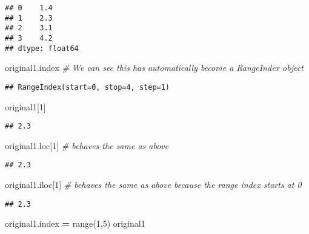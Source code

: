 \documentclass[
]{book}
\newenvironment{Shaded}{\begin{snugshade}}{\end{snugshade}}
\newcommand{\BuiltInTok}[1]{#1}
\newcommand{\CommentTok}[1]{\textcolor[rgb]{0.56,0.35,0.01}{\textit{#1}}}
\newcommand{\DecValTok}[1]{\textcolor[rgb]{0.00,0.00,0.81}{#1}}
\newcommand{\NormalTok}[1]{#1}
\newcommand{\OperatorTok}[1]{\textcolor[rgb]{0.81,0.36,0.00}{\textbf{#1}}}
\begin{document}
\begin{verbatim}
## 0    1.4
## 1    2.3
## 2    3.1
## 3    4.2
## dtype: float64
\end{verbatim}

\begin{Shaded}
\begin{Highlighting}[]
\NormalTok{original1.index }\CommentTok{\# We can see this has automatically become a RangeIndex object}
\end{Highlighting}
\end{Shaded}

\begin{verbatim}
## RangeIndex(start=0, stop=4, step=1)
\end{verbatim}

\begin{Shaded}
\begin{Highlighting}[]
\NormalTok{original1[}\DecValTok{1}\NormalTok{]}
\end{Highlighting}
\end{Shaded}

\begin{verbatim}
## 2.3
\end{verbatim}

\begin{Shaded}
\begin{Highlighting}[]
\NormalTok{original1.loc[}\DecValTok{1}\NormalTok{] }\CommentTok{\# behaves the same as above}
\end{Highlighting}
\end{Shaded}

\begin{verbatim}
## 2.3
\end{verbatim}

\begin{Shaded}
\begin{Highlighting}[]
\NormalTok{original1.iloc[}\DecValTok{1}\NormalTok{] }\CommentTok{\# behaves the same as above because the range index starts at 0}
\end{Highlighting}
\end{Shaded}

\begin{verbatim}
## 2.3
\end{verbatim}

\begin{Shaded}
\begin{Highlighting}[]
\NormalTok{original1.index }\OperatorTok{=} \BuiltInTok{range}\NormalTok{(}\DecValTok{1}\NormalTok{,}\DecValTok{5}\NormalTok{)}
\NormalTok{original1}
\end{Highlighting}
\end{Shaded}
\end{document}
